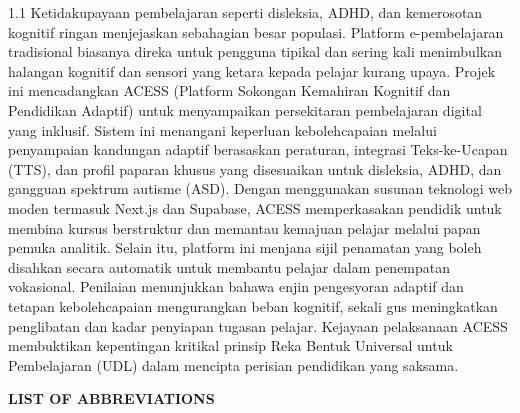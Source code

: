 \documentclass[12pt,a4paper]{report}
\begin{document}
\vspace{1cm}
\begin{spacing}{1.1}
Ketidakupayaan pembelajaran seperti disleksia, ADHD, dan kemerosotan kognitif ringan menjejaskan sebahagian besar populasi. Platform e-pembelajaran tradisional biasanya direka untuk pengguna tipikal dan sering kali menimbulkan halangan kognitif dan sensori yang ketara kepada pelajar kurang upaya. Projek ini mencadangkan ACESS (Platform Sokongan Kemahiran Kognitif dan Pendidikan Adaptif) untuk menyampaikan persekitaran pembelajaran digital yang inklusif. Sistem ini menangani keperluan kebolehcapaian melalui penyampaian kandungan adaptif berasaskan peraturan, integrasi Teks-ke-Ucapan (TTS), dan profil paparan khusus yang disesuaikan untuk disleksia, ADHD, dan gangguan spektrum autisme (ASD). Dengan menggunakan susunan teknologi web moden termasuk Next.js dan Supabase, ACESS memperkasakan pendidik untuk membina kursus berstruktur dan memantau kemajuan pelajar melalui papan pemuka analitik. Selain itu, platform ini menjana sijil penamatan yang boleh disahkan secara automatik untuk membantu pelajar dalam penempatan vokasional. Penilaian menunjukkan bahawa enjin pengesyoran adaptif dan tetapan kebolehcapaian mengurangkan beban kognitif, sekali gus meningkatkan penglibatan dan kadar penyiapan tugasan pelajar. Kejayaan pelaksanaan ACESS membuktikan kepentingan kritikal prinsip Reka Bentuk Universal untuk Pembelajaran (UDL) dalam mencipta perisian pendidikan yang saksama.
\end{spacing}

\vfill \null
\newpage

\vfill \null
{}
{}
\tableofcontents
\newpage

\vfill \null 
{}
{}
{%
\let\oldnumberline\numberline%
\renewcommand{\numberline}{\tablename~\oldnumberline}%
\listoftables%
}
\newpage

\vfill \null
{}
{}
{%
\let\oldnumberline\numberline%
\renewcommand{\numberline}{\figurename~\oldnumberline}%
\listoffigures%
}
\newpage

\vfill \null
{}
{}
\begin{center}
\textbf{LIST OF ABBREVIATIONS}
\end{center}
\vspace{2cm}
\end{document}

